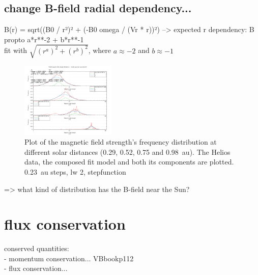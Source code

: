 \subsection{change B-field radial dependency...}
B(r) = sqrt((B0 / r²)² + (-B0 omega / (Vr * r))²)	--> expected r dependency: B propto a*r**-2 + b*r**-1\\
fit with $\sqrt{(r^a)^2 + (r^b)^2}$, where $a \approx -2$ and $b \approx -1$\\

\begin{figure}[htb]
	\centering
	\includegraphics[width=0.4\textwidth]{images/gnuplots/double_fit_B_freq_r_plot_thesis.png}
	\caption{Plot of the magnetic field strength's frequency distribution at different solar distances (0.29, 0.52, 0.75 and 0.98~au). The Helios data, the composed fit model and both its components are plotted. 0.23~au steps, lw 2, stepfunction}
	\label{fig:double_fit_B_freq_r_plot_thesis}
\end{figure}

=> what kind of distribution has the B-field near the Sun?\\



\section{flux conservation}
conserved quantities:\\
- momentum conservation... VBbookp112\\
- flux conservation...\\



